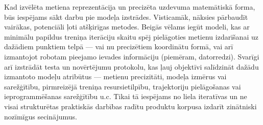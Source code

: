 \documentclass[12pt, a4paper]{article}
\numberwithin{equation}{section} %
\begin{document}
Kad izvēlēta metiena reprezentācija un precizēta uzdevuma matemātiskā forma, būs iespējams sākt darbu pie modeļa izstrādes. Visticamāk, nāksies pārbaudīt vairākas, potenciāli ļoti atšķirīgas metodes. Beigās vēlams iegūt modeli, kas ar minimālu papildus treniņa iterāciju skaitu spēj pielāgoties metienu izdarīšanai uz dažādiem punktiem telpā --- vai nu precizētiem koordinātu formā, vai arī izmantojot robotam pieejamo ievades informāciju (piemēram, datorredzi). Svarīgi arī izstrādāt testa un novērtējumu protokolu, kas ļauj objektīvi salīdzināt dažādu izmantoto modeļu atribūtus --- metienu precizitāti, modeļa izmērus vai sarežģītību, pirmreizējā treniņa resursietilpību, trajektoriju pielāgošanas vai ieprogrammēšanas sarežģītību u.c. Tikai tā iespējams no liela iteratīvas un ne visai strukturētas praktiskās darbības radītu produktu korpusa izdarīt zinātniski nozīmīgus secinājumus.

\newpage
{}
\printbibliography[title=Atsauces]
\end{document}

